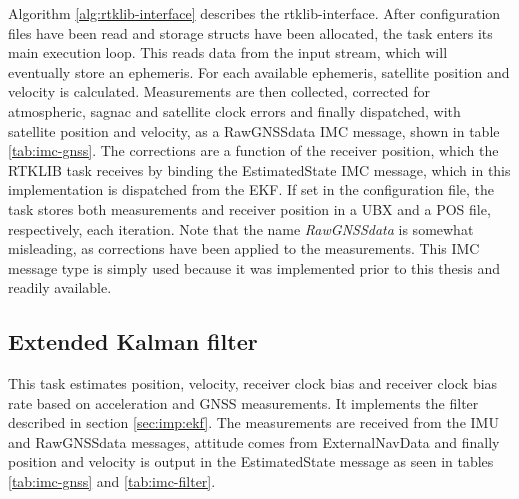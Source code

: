     Algorithm \ref{alg:rtklib-interface} describes the rtklib-interface. After configuration files have been read and storage structs have been allocated, the task enters its main execution loop. This reads data from the input stream, which will eventually store an ephemeris. For each available ephemeris, satellite position and velocity is calculated. Measurements are then collected, corrected for atmospheric, sagnac and satellite clock errors and finally dispatched, with satellite position and velocity, as a RawGNSSdata IMC message, shown in table \ref{tab:imc-gnss}. The corrections are a function of the receiver position, which the RTKLIB task receives by binding the EstimatedState IMC message, which in this implementation is dispatched from the EKF. If set in the configuration file, the task stores both measurements and receiver position in a UBX and a POS file, respectively, each iteration. Note that the name \textit{RawGNSSdata} is somewhat misleading, as corrections have been applied to the measurements. This IMC message type is simply used because it was implemented prior to this thesis and readily available.
    
\subsection{Extended Kalman filter}
    \label{sec:imp:ekf-dune}
    This task estimates position, velocity, receiver clock bias and receiver clock bias rate based on acceleration and GNSS measurements. It implements the filter described in section \ref{sec:imp:ekf}. The measurements are received from the IMU and RawGNSSdata messages, attitude comes from ExternalNavData and finally position and velocity is output in the EstimatedState message as seen in tables \ref{tab:imc-gnss} and \ref{tab:imc-filter}.\\
    
